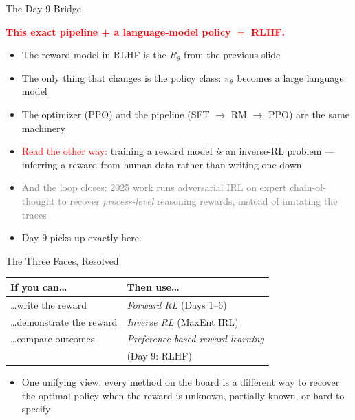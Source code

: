 \begin{frame}{The Day-9 Bridge}
\vspace{0.6em}
\begin{center}
\textcolor{red}{\textbf{This exact pipeline + a language-model policy $=$ RLHF.}}
\end{center}
\vspace{0.9em}
\begin{itemize}
    \setlength{\itemsep}{0.65em}
    \item The reward model in RLHF is the $R_\theta$ from the previous slide
    \item The only thing that changes is the policy class: $\pi_\theta$ becomes a large language model
    \item The optimizer (PPO) and the pipeline (SFT $\to$ RM $\to$ PPO) are the same machinery
    \item \textcolor{red}{Read the other way:} training a reward model \emph{is} an inverse-RL problem --- inferring a reward from human data rather than writing one down
    \item \textcolor{gray}{And the loop closes: 2025 work runs adversarial IRL on expert chain-of-thought to recover \emph{process-level} reasoning rewards, instead of imitating the traces}
    \item Day 9 picks up exactly here.
\end{itemize}
\end{frame}

\begin{frame}{The Three Faces, Resolved}
\begin{center}
\renewcommand{\arraystretch}{1.6}
\small
\begin{tabular}{p{}p{}}
\hline
\textbf{If you can\ldots} & \textbf{Then use\ldots} \\
\hline
\ldots write the reward & \emph{Forward RL} (Days 1--6) \\
\ldots demonstrate the reward & \emph{Inverse RL} (MaxEnt IRL) \\
\ldots compare outcomes & \emph{Preference-based reward learning} \\
                       & (Day 9: RLHF) \\
\hline
\end{tabular}
\end{center}
\vspace{1em}
\begin{itemize}
    \item One unifying view: every method on the board is a different way to recover the optimal policy when the reward is unknown, partially known, or hard to specify
\end{itemize}
\end{frame}
